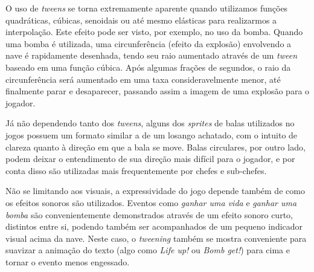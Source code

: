 O uso de \textit{tweens} se torna extremamente aparente quando utilizamos funções quadráticas, cúbicas, senoidais ou até mesmo elásticas para realizarmos a interpolação. Este efeito pode ser visto, por exemplo, no uso da bomba. Quando uma bomba é utilizada, uma circunferência (efeito da explosão) envolvendo a nave é rapidamente desenhada, tendo seu raio aumentado através de um \textit{tween} baseado em uma função cúbica. Após algumas frações de segundos, o raio da circunferência será aumentado em uma taxa consideravelmente menor, até finalmente parar e desaparecer, passando assim a imagem de uma explosão para o jogador.

Já não dependendo tanto dos \textit{tweens}, alguns dos \textit{sprites} de balas utilizados no jogos possuem um formato similar a de um losango achatado, com o intuito de clareza quanto à direção em que a bala se move. Balas circulares, por outro lado, podem deixar o entendimento de sua direção mais difícil para o jogador, e por conta disso são utilizadas mais frequentemente por chefes e sub-chefes.

Não se limitando aos visuais, a expressividade do jogo depende também de como os efeitos sonoros são utilizados. Eventos como \textit{ganhar uma vida} e \textit{ganhar uma bomba} são convenientemente demonstrados através de um efeito sonoro curto, distintos entre si, podendo também ser acompanhados de um pequeno indicador visual acima da nave. Neste caso, o \textit{tweening} também se mostra conveniente para suavizar a animação do texto (algo como \textit{Life up!} ou \textit{Bomb get!}) para cima e tornar o evento menos engessado.


